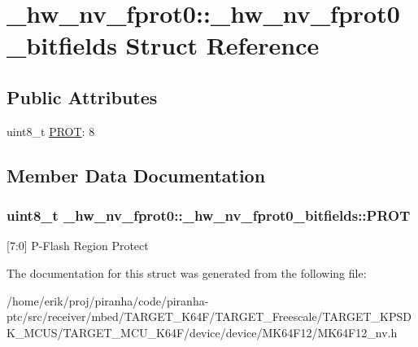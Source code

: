 \hypertarget{struct__hw__nv__fprot0_1_1__hw__nv__fprot0__bitfields}{}\section{\+\_\+hw\+\_\+nv\+\_\+fprot0\+:\+:\+\_\+hw\+\_\+nv\+\_\+fprot0\+\_\+bitfields Struct Reference}
\label{struct__hw__nv__fprot0_1_1__hw__nv__fprot0__bitfields}
\subsection*{Public Attributes}
\begin{DoxyCompactItemize}
\item 
uint8\+\_\+t \hyperlink{struct__hw__nv__fprot0_1_1__hw__nv__fprot0__bitfields_addbac8781430b0264e134143158e2728}{P\+R\+OT}\+: 8
\end{DoxyCompactItemize}


\subsection{Member Data Documentation}
\subsubsection[{\texorpdfstring{P\+R\+OT}{PROT}}]{\setlength{\rightskip}{0pt plus 5cm}uint8\+\_\+t \+\_\+hw\+\_\+nv\+\_\+fprot0\+::\+\_\+hw\+\_\+nv\+\_\+fprot0\+\_\+bitfields\+::\+P\+R\+OT}\hypertarget{struct__hw__nv__fprot0_1_1__hw__nv__fprot0__bitfields_addbac8781430b0264e134143158e2728}{}\label{struct__hw__nv__fprot0_1_1__hw__nv__fprot0__bitfields_addbac8781430b0264e134143158e2728}
\mbox{[}7\+:0\mbox{]} P-\/\+Flash Region Protect 

The documentation for this struct was generated from the following file\+:\begin{DoxyCompactItemize}
\item 
/home/erik/proj/piranha/code/piranha-\/ptc/src/receiver/mbed/\+T\+A\+R\+G\+E\+T\+\_\+\+K64\+F/\+T\+A\+R\+G\+E\+T\+\_\+\+Freescale/\+T\+A\+R\+G\+E\+T\+\_\+\+K\+P\+S\+D\+K\+\_\+\+M\+C\+U\+S/\+T\+A\+R\+G\+E\+T\+\_\+\+M\+C\+U\+\_\+\+K64\+F/device/device/\+M\+K64\+F12/M\+K64\+F12\+\_\+nv.\+h\end{DoxyCompactItemize}
